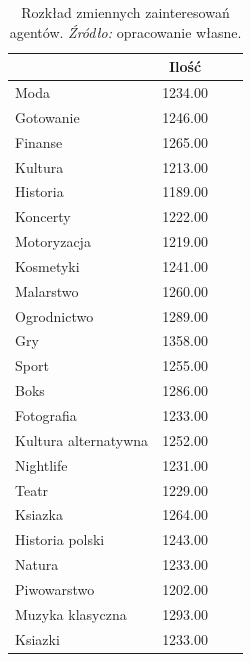\documentclass[polish, twoside, 12pt, a4paper]{article}
\theoremstyle{definition}
\theoremstyle{plain}
\theoremstyle{remark}
\begin{document}
\begin{table}[hbt] 
  \centering

  \captionsetup{margin=10pt,font=small,labelfont=bf,width=.8\textwidth}

  \caption[Przykład prostej tablicy]{Rozkład zmiennych zainteresowań agentów. \textit{Źródło:} opracowanie własne.}
  \label{tab:zainteresowania}

\vspace*{2ex}
  \begin{tabular}{lccc}
  \hline
 & Ilość \\ 
  \hline
Moda & 1234.00 \\ 
  Gotowanie & 1246.00 \\ 
  Finanse & 1265.00 \\ 
  Kultura & 1213.00 \\ 
  Historia & 1189.00 \\ 
  Koncerty & 1222.00 \\ 
  Motoryzacja & 1219.00 \\ 
  Kosmetyki & 1241.00 \\ 
  Malarstwo & 1260.00 \\ 
  Ogrodnictwo & 1289.00 \\ 
  Gry & 1358.00 \\ 
  Sport & 1255.00 \\ 
  Boks & 1286.00 \\ 
  Fotografia & 1233.00 \\ 
  Kultura alternatywna & 1252.00 \\ 
  Nightlife & 1231.00 \\ 
  Teatr & 1229.00 \\ 
  Ksiazka & 1264.00 \\ 
  Historia polski & 1243.00 \\ 
  Natura & 1233.00 \\ 
  Piwowarstwo & 1202.00 \\ 
  Muzyka klasyczna & 1293.00 \\ 
  Ksiazki & 1233.00 \\ 
   \hline
\end{tabular}
\end{table}
\end{document}
